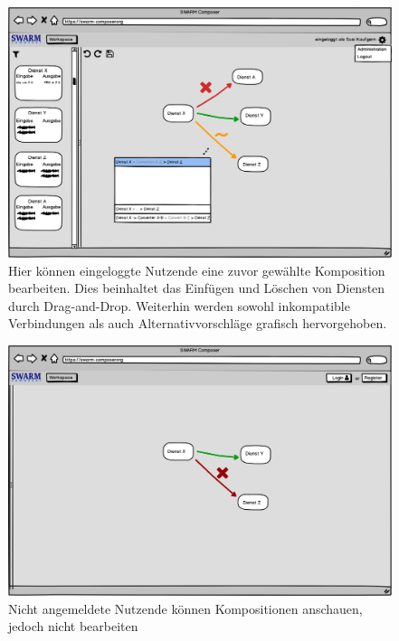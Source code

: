\begin{figure}[h]
	\centering
	\includegraphics[width=\textwidth]{img/editor}
	\caption{
            Hier können eingeloggte Nutzende eine zuvor gewählte Komposition
            bearbeiten. Dies beinhaltet das Einfügen und Löschen von Diensten durch
            Drag-and-Drop. Weiterhin werden sowohl inkompatible Verbindungen
            als auch Alternativvorschläge grafisch hervorgehoben.
        }
	\label{fig:editor-web}
\end{figure}

\begin{figure}[h]
	\centering
	\includegraphics[width=\textwidth]{img/nichtangemeldet}
	\caption{
          Nicht angemeldete Nutzende können Kompositionen anschauen, jedoch nicht bearbeiten
        }
	\label{fig:nichtangemeldet}
\end{figure}

